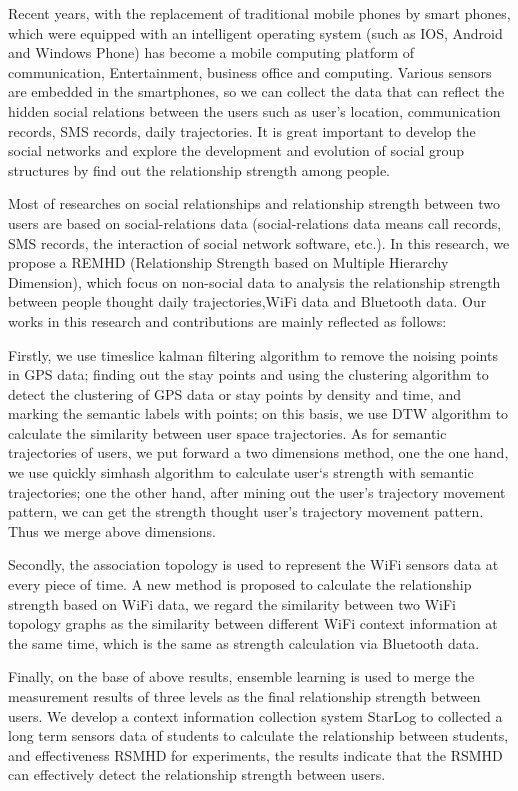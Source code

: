 \begin{eabstract}
Recent years, with the replacement of traditional mobile phones by smart phones, which were equipped with an intelligent operating system (such as IOS, Android and Windows Phone) has become a mobile computing platform of communication, Entertainment, business office and computing. Various sensors are embedded in the smartphones, so we can collect the data that can reflect the hidden social relations between the users such as user's location, communication records, SMS records, daily trajectories. It is great important to develop the social networks and explore the development and evolution of social group structures by find out the relationship strength among people.
\par Most of researches on social relationships and relationship strength between two users are based on social-relations data (social-relations data means call records, SMS records, the interaction of social network software, etc.). In this research, we propose a REMHD (Relationship Strength based on Multiple Hierarchy Dimension), which focus on non-social data to analysis the relationship strength between people thought daily trajectories,WiFi data and Bluetooth data. Our works in this research and contributions are mainly reflected as follows:

\par Firstly, we use timeslice kalman filtering algorithm to remove the noising points in GPS data; finding out the stay points and using the clustering algorithm to detect the clustering of GPS data or stay points by density and time, and marking the semantic labels with points; on this basis, we use DTW algorithm to calculate the similarity between user space trajectories. As for semantic trajectories of users, we put forward a two dimensions method, one the one hand, we use quickly simhash algorithm to calculate user`s strength with semantic trajectories; one the other hand, after mining out the user's trajectory movement pattern, we can get the strength thought user's trajectory movement pattern. Thus we merge above dimensions.
\par Secondly, the association topology is used to represent the WiFi sensors data at every piece of time. A new method is proposed to calculate the relationship strength based on WiFi data, we regard the similarity between two WiFi topology graphs as the similarity between different WiFi context information at the same time, which is the same as strength calculation via Bluetooth data.
\par Finally, on the base of above results, ensemble learning is used to merge the measurement results of three levels as the final relationship strength between users. We develop a context information collection system StarLog to collected a long term sensors data of students to calculate the relationship between students, and effectiveness RSMHD for experiments, the results indicate that the RSMHD can effectively detect the relationship strength between users.
\end{eabstract}

